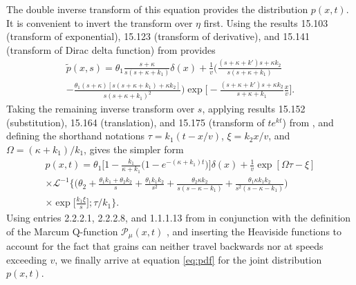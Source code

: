 \documentclass[]{agujournal2018}
\newcommand\tp{\tilde{p}}
\newcommand\El{\mathcal{L}}
\begin{document}
The double inverse transform of this equation provides the distribution $p(x,t)$.
It is convenient to invert the transform over $\eta$ first.
Using the results 15.103 (transform of exponential), 15.123 (transform of derivative), and 15.141 (transform of Dirac delta function) from \citet{Arfken1985} provides 
\begin{multline} \tp(x,s) = \theta_1 \frac{s+\kappa}{s(s+\kappa + k_1)}\delta(x) + \frac{1}{v} \Big(\frac{(s+\kappa+k')s+\kappa k_2}{s(s+\kappa+k_1)} \\- \frac{\theta_1(s+\kappa)[s(s+\kappa+k_1)+\kappa k_2]}{s(s+\kappa+k_1)^2}\Big)
\exp\Big[-\frac{(s+\kappa+k')s+\kappa k_2}{s+\kappa+k_1}\frac{x}{v}\Big].\end{multline}
Taking the remaining inverse transform over $s$, applying results 15.152 (substitution), 15.164 (translation), and 15.175 (transform of $te^{kt}$) from \citet{Arfken1985}, and defining the shorthand notations $\tau = k_1(t-x/v)$, $\xi = k_2 x/v$, and $\Omega = (\kappa + k_1)/k_1$, gives the simpler form 
\begin{multline}
p(x,t) = \theta_1\Big[1-\frac{k_1}{\kappa + k_1}\big(1-e^{-(\kappa + k_1)t}\big)\Big]\delta(x) + \frac{1}{v}\exp[\Omega \tau - \xi]\\
\times \El^{-1}\Big\{\Big( \theta_2 + \frac{\theta_1k_1+\theta_2 k_2}{s}+\frac{\theta_1k_1k_2}{s^2} + \frac{\theta_2\kappa k_2}{s(s-\kappa-k_1)} + \frac{\theta_1\kappa k_1 k_2}{s^2(s-\kappa-k_1)}\Big)\\
\times\exp\big[\frac{k_1 \xi}{s}\big];\tau/k_1\Big\}.
\end{multline}
Using entries 2.2.2.1, 2.2.2.8, and 1.1.1.13 from \citet{Prudnikov1992a} in conjunction with the definition of the Marcum Q-function $ \mathcal{P}_\mu(x,t)$ \citep[e.g.][]{Temme1996}, and inserting the Heaviside functions to account for the fact that grains can neither travel backwards nor at speeds exceeding $v$, we finally arrive at equation \ref{eq:pdf} for the joint distribution $p(x,t)$.
\end{document}
